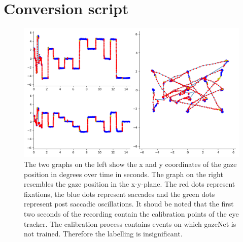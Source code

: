 \documentclass[conference]{IEEEtran}
\begin{document}
\section{Conversion script}
\begin{figure}[h]
    \includegraphics[width=\linewidth]{Kreuze_Random Recording1_short}
    \caption{The two graphs on the left show the x and y coordinates of the gaze position in degrees over time in seconds. The graph on the right resembles the gaze position in the x-y-plane. The red dots represent fixations, the blue dots represent saccades and the green dots represent post saccadic oscillations. It shoud be noted that the first two seconds of the recording contain the calibration points of the eye tracker. The calibration process contains events on which gazeNet is not trained. Therefore the labelling is insignificant.}
\end{figure}




\end{document}
